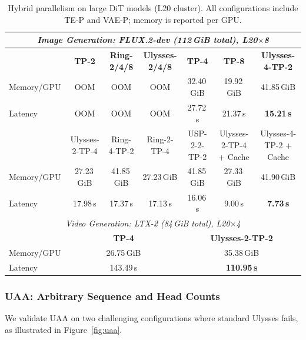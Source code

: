 \documentclass[10pt]{article}
\begin{document}
\begin{table}[htbp]
\centering
\caption{Hybrid parallelism on large DiT models (L20 cluster). All configurations include TE-P and VAE-P; memory is reported per GPU.}
\label{tab:hybrid_parallelism}
{\scriptsize
\setlength{\tabcolsep}{3pt}
\renewcommand{\arraystretch}{1.12}
\begin{tabular}{lcccccc}
\toprule
\multicolumn{7}{c}{\textit{Image Generation: FLUX.2-dev (112\,GiB total), L20$\times$8}} \\
\midrule
 & \textbf{TP-2} & \textbf{Ring-2/4/8} & \textbf{Ulysses-2/4/8} & \textbf{TP-4} & \textbf{TP-8} & \textbf{Ulysses-4-TP-2} \\
Memory/GPU & OOM & OOM & OOM & 32.40\,GiB & 19.92\,GiB & 41.85\,GiB \\
Latency & OOM & OOM & OOM & 27.72\,s & 21.37\,s & \textbf{15.21\,s} \\
 & Ulysses-2-TP-4 & Ring-4-TP-2 & Ring-2-TP-4 & USP-2-2-TP-2 & Ulysses-2-TP-4 + Cache & Ulysses-4-TP-2 + Cache \\
Memory/GPU & 27.23\,GiB & 41.85\,GiB & 27.23\,GiB & 41.85\,GiB & 27.33\,GiB & 41.90\,GiB \\
Latency & 17.98\,s & 17.37\,s & 17.13\,s & 16.06\,s & 9.00\,s & \textbf{7.73\,s} \\
\midrule
\multicolumn{7}{c}{\textit{Video Generation: LTX-2 (84\,GiB total), L20$\times$4}} \\
\midrule
 & \multicolumn{3}{c}{\textbf{TP-4}} & \multicolumn{3}{c}{\textbf{Ulysses-2-TP-2}} \\
Memory/GPU & \multicolumn{3}{c}{26.75\,GiB} & \multicolumn{3}{c}{35.38\,GiB} \\
Latency & \multicolumn{3}{c}{143.49\,s} & \multicolumn{3}{c}{\textbf{110.95\,s}} \\
\bottomrule
\end{tabular}
}
\end{table}

\subsubsection{UAA: Arbitrary Sequence and Head Counts}

We validate UAA on two challenging configurations where standard Ulysses fails, as illustrated in Figure~\ref{fig:uaa}.
\end{document}
